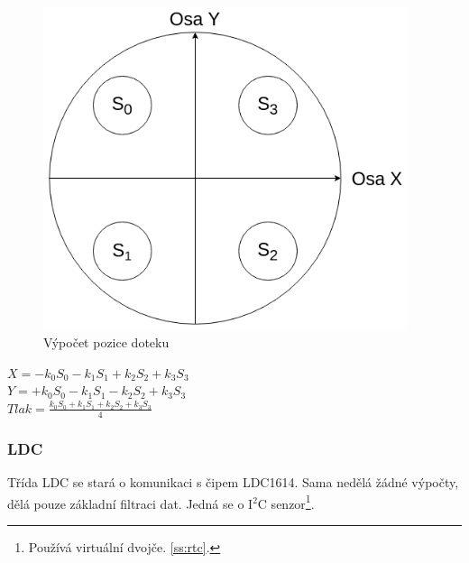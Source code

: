 \begin{figure}[H]
    \begin{small}
        \begin{center}
            \includegraphics[width=0.95\textwidth]{img/Touchpad_calculation.png}
        \end{center}
        \caption{Výpočet pozice doteku}
        \label{fig:touchpad_calculation}
    \end{small}
\end{figure}

\begin{listedequation}[H]
    \begin{center}
        $X = -k_0S_0 -k_1S_1 +k_2S_2 +k_3S_3$\\
        $Y = +k_0S_0 -k_1S_1 -k_2S_2 +k_3S_3$\\
        $Tlak = \frac{k_0S_0 +k_1S_1 +k_2S_2 +k_3S_3}{4}$
    \end{center}
    \caption{Výpočet parametrů doteku}
    \label{eq:touchpad_calculation_X}
\end{listedequation}

\subsubsection{LDC}

Třída LDC se stará o komunikaci s čipem LDC1614.
Sama nedělá žádné výpočty, dělá pouze základní filtraci dat.
Jedná se o I$^2$C senzor\footnote{Používá virtuální dvojče. \autoref{ss:rtc}.}.

